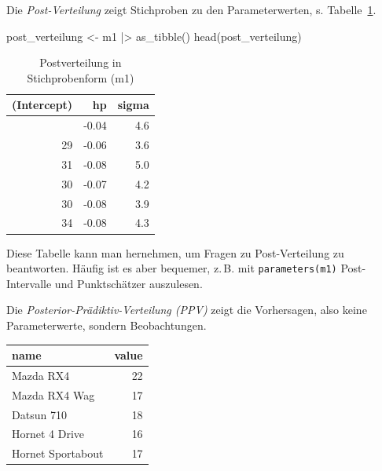\documentclass[
  ngerman,
  letterpaper,
  twoside,
  open=any]{scrbook}
\newenvironment{Shaded}{\begin{snugshade}}{\end{snugshade}}
\newcommand{\FunctionTok}[1]{\textcolor[rgb]{0.28,0.35,0.67}{#1}}
\newcommand{\NormalTok}[1]{\textcolor[rgb]{0.00,0.23,0.31}{#1}}
\newcommand{\OtherTok}[1]{\textcolor[rgb]{0.00,0.23,0.31}{#1}}
\newcommand{\SpecialCharTok}[1]{\textcolor[rgb]{0.37,0.37,0.37}{#1}}
\newcounter{none} %
\theoremstyle{definition}
\theoremstyle{plain}
\theoremstyle{definition}
\theoremstyle{definition}
\theoremstyle{definition}
\theoremstyle{definition}
\theoremstyle{remark}
\begin{document}
Die \emph{Post-Verteilung} zeigt Stichproben zu den Parameterwerten, s.
Tabelle~\ref{tbl-post-m1}.

\begin{Shaded}
\begin{Highlighting}[]
\NormalTok{post\_verteilung }\OtherTok{\textless{}{-}}\NormalTok{ m1 }\SpecialCharTok{|\textgreater{}} 
  \FunctionTok{as\_tibble}\NormalTok{()}
\FunctionTok{head}\NormalTok{(post\_verteilung)}
\end{Highlighting}
\end{Shaded}

{

\begin{longtable}[]{@{}rrr@{}}

\caption{\label{tbl-post-m1}Postverteilung in Stichprobenform (m1)}

\tabularnewline

\toprule\noalign{}
(Intercept) & hp & sigma \\
\midrule\noalign{}
\endhead
\bottomrule\noalign{}
\endlastfoot
25 & -0.04 & 4.6 \\
29 & -0.06 & 3.6 \\
31 & -0.08 & 5.0 \\
30 & -0.07 & 4.2 \\
30 & -0.08 & 3.9 \\
34 & -0.08 & 4.3 \\

\end{longtable}

}

Diese Tabelle kann man hernehmen, um Fragen zu Post-Verteilung zu
beantworten. Häufig ist es aber bequemer, z.\,B. mit
\texttt{parameters(m1)} Post-Intervalle und Punktschätzer auszulesen.

Die \emph{Posterior-Prädiktiv-Verteilung (PPV)} zeigt die Vorhersagen,
also keine Parameterwerte, sondern Beobachtungen.

{\def\LTcaptype{none} %
\begin{longtable}[]{@{}lr@{}}
\toprule\noalign{}
name & value \\
\midrule\noalign{}
\endhead
\bottomrule\noalign{}
\endlastfoot
Mazda RX4 & 22 \\
Mazda RX4 Wag & 17 \\
Datsun 710 & 18 \\
Hornet 4 Drive & 16 \\
Hornet Sportabout & 17 \\
\end{longtable}
}
\end{document}
